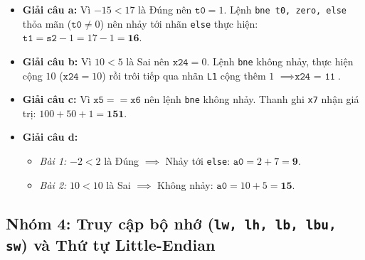 \begin{itemize}
    \item \textbf{Giải câu a:} Vì $-15 < 17$ là Đúng nên $\texttt{t0} = 1$. Lệnh \texttt{bne t0, zero, else} thỏa mãn ($\texttt{t0} \neq 0$) nên nhảy tới nhãn \texttt{else} thực hiện: $\texttt{t1} = \texttt{s2} - 1 = 17 - 1 = \mathbf{16}$.
    \item \textbf{Giải câu b:} Vì $10 < 5$ là Sai nên $\texttt{x24} = 0$. Lệnh \texttt{bne} không nhảy, thực hiện cộng $10$ ($\texttt{x24} = 10$) rồi trôi tiếp qua nhãn \texttt{L1} cộng thêm $1$ $\implies \mathbf{\texttt{x24 = 11}}$.
    \item \textbf{Giải câu c:} Vì $\texttt{x5} == \texttt{x6}$ nên lệnh \texttt{bne} không nhảy. Thanh ghi \texttt{x7} nhận giá trị: $100 + 50 + 1 = \mathbf{151}$.
    \item \textbf{Giải câu d:}
    \begin{itemize}
        \item \textit{Bài 1:} $-2 < 2$ là Đúng $\implies$ Nhảy tới \texttt{else}: $\texttt{a0} = 2 + 7 = \mathbf{9}$.
        \item \textit{Bài 2:} $10 < 10$ là Sai $\implies$ Không nhảy: $\texttt{a0} = 10 + 5 = \mathbf{15}$.
    \end{itemize}
\end{itemize}

\subsection{Nhóm 4: Truy cập bộ nhớ (\texttt{lw, lh, lb, lbu, sw}) và Thứ tự Little-Endian}

